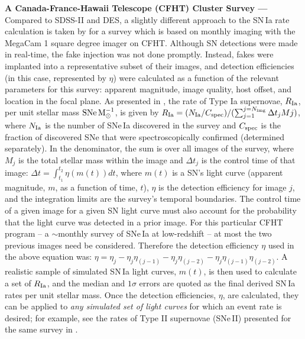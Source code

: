 \documentclass[DM,lsstdraft,toc]{lsstdoc}
\begin{document}
{\bf A Canada-France-Hawaii Telescope (CFHT) Cluster Survey ---} Compared to SDSS-II and DES, a slightly different approach to the SN\,Ia rate calculation is taken by \cite{2012ApJ...746..163S} for a survey which is based on monthly imaging with the MegaCam 1 square degree imager on CFHT. Although SN detections were made in real-time, the fake injection was not done promptly. Instead, fakes were implanted into a representative subset of their images, and detection efficiencies (in this case, represented by $\eta$) were calculated as a function of the relevant parameters for this survey: apparent magnitude, image quality, host offset, and location in the focal plane. As presented in \cite{2012ApJ...746..163S}, the rate of Type Ia supernovae, $R_{\rm Ia}$, per unit stellar mass $\rm SNe\, M_{\odot}^{-1}$, is given by $R_{\rm Ia} = (N_{\rm Ia} / C_{\rm spec}) / ( \sum_{j=1}^{j=N_{\rm img}} \Delta t_j Mj )$, where $N_{\rm Ia}$ is the number of SNe\,Ia discovered in the survey and $C_{\rm spec}$ is the fraction of discovered SNe that were spectroscopically confirmed (determined separately). In the denominator, the sum is over all images of the survey, where $M_j$ is the total stellar mass within the image and $\Delta t_j$ is the control time of that image: $\Delta t = \int_{t_1}^{t_2} \eta(m(t)) dt$, where $m(t)$ is a SN's light curve (apparent magnitude, $m$, as a function of time, $t$), $\eta$ is the detection efficiency for image $j$, and the integration limits are the survey's temporal boundaries. The control time of a given image for a given SN light curve must also account for the probability that the light curve was detected in a prior image. For this particular CFHT program -- a $\sim$monthly survey of SNe\,Ia at low-redshift -- at most the two previous images need be considered. Therefore the detection efficiency $\eta$ used in the above equation was: $\eta = \eta_j - \eta_j \eta_{(j-1)} - \eta_j \eta_{(j-2)} - \eta_j \eta_{(j-1)} \eta_{(j-2)}$. A realistic sample of simulated SN\,Ia light curves, $m(t)$, is then used to calculate a set of $R_{\rm Ia}$, and the median and $1\sigma$ errors are quoted as the final derived SN\,Ia rates per unit stellar mass. Once the detection efficiencies, $\eta$, are calculated, they can be applied to {\it any simulated set of light curves} for which an event rate is desired; for example, see the rates of Type II supernovae (SNe\,II) presented for the same survey in \cite{2012ApJ...753...68G}.
\end{document}
